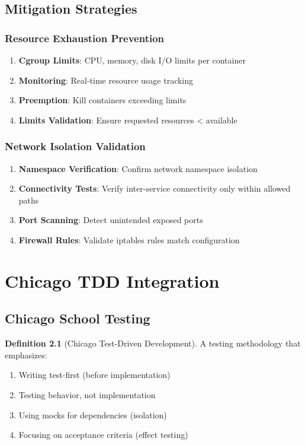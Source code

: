 \documentclass[12pt,twoside,openright]{book}
\theoremstyle{plain}
\theoremstyle{definition}
\newtheorem{definition}[theorem]{Definition}
\theoremstyle{remark}
\begin{document}
\section{Mitigation Strategies}

\subsection{Resource Exhaustion Prevention}

\begin{enumerate}
  \item \textbf{Cgroup Limits}: CPU, memory, disk I/O limits per container
  \item \textbf{Monitoring}: Real-time resource usage tracking
  \item \textbf{Preemption}: Kill containers exceeding limits
  \item \textbf{Limits Validation}: Ensure requested resources < available
\end{enumerate}

\subsection{Network Isolation Validation}

\begin{enumerate}
  \item \textbf{Namespace Verification}: Confirm network namespace isolation
  \item \textbf{Connectivity Tests}: Verify inter-service connectivity only within allowed paths
  \item \textbf{Port Scanning}: Detect unintended exposed ports
  \item \textbf{Firewall Rules}: Validate iptables rules match configuration
\end{enumerate}

\chapter{Chicago TDD Integration}

\section{Chicago School Testing}

\begin{definition}[Chicago Test-Driven Development]
A testing methodology that emphasizes:
\begin{enumerate}
  \item Writing test-first (before implementation)
  \item Testing behavior, not implementation
  \item Using mocks for dependencies (isolation)
  \item Focusing on acceptance criteria (effect testing)
\end{enumerate}
\end{definition}
\end{document}
